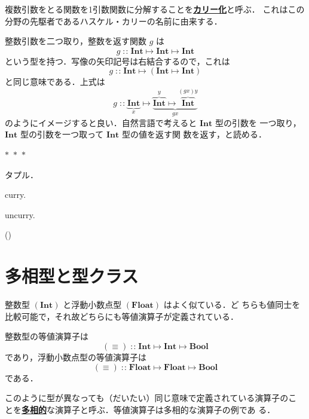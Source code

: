 \documentclass[a5paper,twoside,fleqn]{jsbook}
\newcommand{\separator}{\begin{center}$*$~$*$~$*$\end{center}}
\newcommand{\keyword}[1]{{\underline{\textbf{#1}}}}
\DeclareMathOperator{\mIn}{{:\!:}}
\DeclareMathOperator{\mMapsTo}{\mapsto}
\newcommand{\mType}[1]{\mathbf{#1}}
\newcommand{\mBoolType}{\mType{Bool}}
\newcommand{\mFloatType}{\mType{Float}}
\newcommand{\mIntType}{\mType{Int}}
\newcommand{\mProj}[2]{#1\mMapsTo#2}
\begin{document}
複数引数をとる関数を1引数関数に分解することを\keyword{カリー化}と呼ぶ．
これはこの分野の先駆者であるハスケル・カリーの名前に由来する．


整数引数を二つ取り，整数を返す関数 $g$ は
\begin{equation}
g\mIn\mProj{\mIntType}{\mProj{\mIntType}{\mIntType}}
\end{equation}
という型を持つ．写像の矢印記号は右結合するので，これは
\begin{equation}
g\mIn\mProj{\mIntType}{\left(\mProj{\mIntType}{\mIntType}\right)}
\end{equation}
と同じ意味である．上式は
\begin{equation*}
g\mIn \underbrace{\mIntType}_x
\mMapsTo\underbrace{\overbrace{\mIntType}^y
  \mMapsTo\overbrace{\mIntType}^{(gx)y}}_{gx}
\end{equation*}
のようにイメージすると良い．自然言語で考えると $\mIntType$ 型の引数を
一つ取り，$\mIntType$ 型の引数を一つ取って $\mIntType$ 型の値を返す関
数を返す，と読める．

\separator

タプル．

curry.

uncurry.

()


\section{多相型と型クラス}

整数型 $(\mIntType)$ と浮動小数点型 $(\mFloatType)$ はよく似ている．ど
ちらも値同士を比較可能で，それ故どちらにも等値演算子が定義されている．

整数型の等値演算子は
\begin{equation}
(\equiv)\mIn\mProj{\mProj{\mIntType}{\mIntType}}{\mBoolType}
\end{equation}
であり，浮動小数点型の等値演算子は
\begin{equation}
(\equiv)\mIn\mProj{\mProj{\mFloatType}{\mFloatType}}{\mBoolType}
\end{equation}
である．

このように型が異なっても（だいたい）同じ意味で定義されている演算子のこ
とを\keyword{多相的}な演算子と呼ぶ．等値演算子は多相的な演算子の例であ
る．
\end{document}
